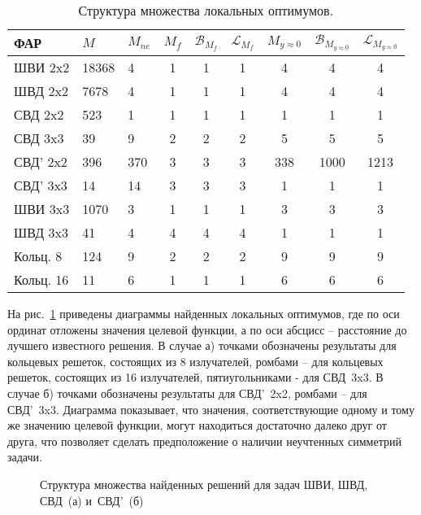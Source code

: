 \begin{table}[!h]
\centering
\caption{Структура множества локальных оптимумов.}
\begin{tabular}{|l | l l | c c c | c c c|}
    \hline
    \textbf{ФАР} & \textbf{$M$} & \textbf{$M_{ne}$} & \textbf{$M_{f}$} & \textbf{$\mathcal{B}_{M_f}$} & \textbf{$\mathcal{L}_{M_f}$} & \textbf{$M_{y\approx0}$} & \textbf{$\mathcal{B}_{M_{y\approx0}}$} & \textbf{$\mathcal{L}_{M_{y\approx0}}$}\\
    \hline
    ШВИ 2x2 & 18368 & 4 & 1 & 1 & 1 & 4 & 4 & 4\\
    ШВД 2x2 & 7678  & 4 & 1 & 1 & 1 & 4 & 4 & 4\\
    СВД 2x2  & 523  & 1 & 1 & 1 & 1 & 1 & 1 & 1\\
    СВД 3x3  & 39  & 9 & 2 & 2 & 2 & 5 & 5 & 5\\
    СВД' 2x2  & 396  & 370 & 3 & 3 & 3 & 338 & 1000 & 1213\\
    СВД' 3x3  & 14  & 14 & 3 & 3 & 3 & 1 & 1 & 1\\
    ШВИ 3x3 & 1070  & 3 & 1 & 1 & 1 & 3 & 3 & 3 \\
    ШВД 3x3 & 41  & 4 & 4 & 4 & 4 & 1 & 1 & 1 \\
    Кольц. 8 & 124  & 9 & 2 & 2 & 2 & 9 & 9 & 9\\
    Кольц. 16 & 11  & 6 & 1 & 1 & 1& 6 & 6 & 6\\
    \hline
\end{tabular}
    \label{tab:structure_0}
\end{table}

На рис.~\ref{ris:fit_dist_0} приведены диаграммы найденных локальных оптимумов, где по оси ординат отложены значения целевой функции, а по оси абсцисс -- расстояние до лучшего известного решения. В случае а) точками обозначены результаты для кольцевых решеток, состоящих из 8 излучателей, ромбами -- для кольцевых решеток, состоящих из 16 излучателей, пятиугольниками - для СВД~3x3. В случае б) точками обозначены результаты для СВД'~2x2, ромбами -- для СВД'~3x3. Диаграмма показывает, что значения, соответствующие одному и тому же значению целевой функции, могут находиться достаточно далеко друг от друга, что позволяет сделать предположение о наличии неучтенных симметрий задачи.

\begin{figure}
\centering
    \begin{minipage}[h]{0.8\linewidth}
    \end{minipage}
    \begin{minipage}[h]{\linewidth}
    \end{minipage}
    \vspace{0.7em}
    \caption{Структура множества найденных решений для задач ШВИ, ШВД, СВД~(а) и~СВД'~(б)}
    \label{ris:fit_dist_0}
\end{figure}

